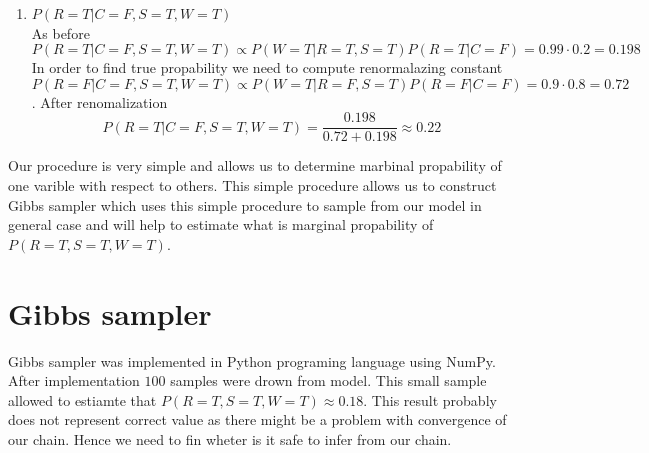 \documentclass[12pt,a4paper]{article}
\begin{document}
\begin{enumerate}
    \item {\Large \textbf{$P(R=T|C=F,S=T,W=T)$}}\\
    As before
    \begin{equation*}
        P(R=T|C=F,S=T,W=T)\propto P(W=T|R=T,S=T)P(R=T|C=F)=0.99\cdot0.2=0.198
    \end{equation*}
    In order to find true propability we need to compute renormalazing constant
    \begin{equation*}
        P(R=F|C=F,S=T,W=T)\propto P(W=T|R=F,S=T)P(R=F|C=F)=0.9\cdot0.8=0.72
    \end{equation*}.
    After renomalization
    \begin{equation*}
        P(R=T|C=F,S=T,W=T)=\frac{0.198}{0.72+0.198}\approx0.22
    \end{equation*}
\end{enumerate}
Our procedure is very simple and allows us to determine marbinal propability of one varible with respect to others.  This simple procedure
allows us to construct Gibbs sampler which uses this simple procedure to sample from our model in general case and will help to estimate what is marginal propability of
$P(R=T,S=T,W=T)$.
\section{Gibbs sampler}
\hspace{1cm} Gibbs sampler was implemented in Python programing language using NumPy. After implementation $100$ samples were drown from 
model. This small sample allowed to estiamte that $P(R=T,S=T,W=T)\approx 0.18$. This result probably does not represent correct value as there might be a problem
with convergence of our chain. Hence we need to fin wheter is it safe to infer from our chain.
\end{document}
